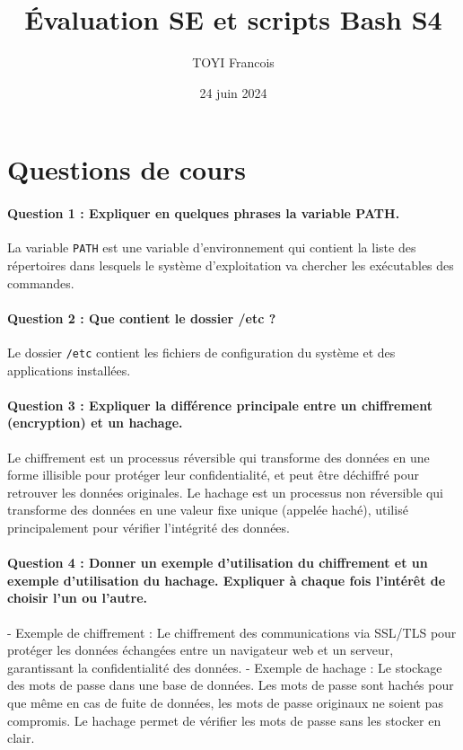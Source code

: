 \documentclass[a4paper,10pt]{article}
\title{Évaluation SE et scripts Bash S4}
\author{TOYI Francois}
\date{24 juin 2024}
\begin{document}
\maketitle

\section*{Questions de cours}

\paragraph{Question 1 : Expliquer en quelques phrases la variable PATH.}
La variable \texttt{PATH} est une variable d'environnement qui contient la liste des répertoires dans lesquels le système d'exploitation va chercher les exécutables des commandes. 

\paragraph{Question 2 : Que contient le dossier /etc ?}
Le dossier \texttt{/etc} contient les fichiers de configuration du système et des applications installées. 

\paragraph{Question 3 : Expliquer la différence principale entre un chiffrement (encryption) et un hachage.}
Le chiffrement est un processus réversible qui transforme des données en une forme illisible pour protéger leur confidentialité, et peut être déchiffré pour retrouver les données originales. Le hachage est un processus non réversible qui transforme des données en une valeur fixe unique (appelée haché), utilisé principalement pour vérifier l'intégrité des données.

\paragraph{Question 4 : Donner un exemple d’utilisation du chiffrement et un exemple d’utilisation du hachage. Expliquer à chaque fois l’intérêt de choisir l’un ou l’autre.}
- Exemple de chiffrement : Le chiffrement des communications via SSL/TLS pour protéger les données échangées entre un navigateur web et un serveur, garantissant la confidentialité des données.
- Exemple de hachage : Le stockage des mots de passe dans une base de données. Les mots de passe sont hachés pour que même en cas de fuite de données, les mots de passe originaux ne soient pas compromis. Le hachage permet de vérifier les mots de passe sans les stocker en clair.
\end{document}
